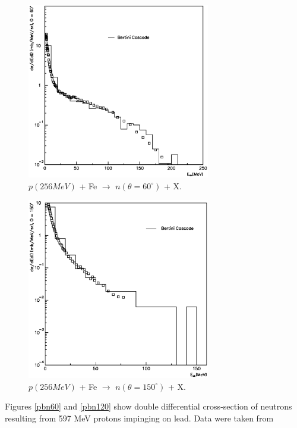 \documentclass[twocolumn,twoside,slac,floatfix]{revtex4}
\begin{document}
\begin{figure}
  \includegraphics[width=80mm,keepaspectratio]{pn_fe_256_n_a2.eps}
  \caption{$p(256 MeV)$ + Fe $\rightarrow$ $n(\theta = 60^{\circ})$ + X.}
  \label{n60}
\end{figure}


\begin{figure}
  \includegraphics[width=80mm,keepaspectratio]{pn_fe_256_n_a4.eps}
  \caption{$p(256 MeV)$ + Fe $\rightarrow$ $n(\theta = 150^{\circ})$ + X.}
  \label{n150}
\end{figure}




Figures \ref{pbn60} and \ref{pbn120} show double differential cross-section of neutrons resulting from 597 MeV protons impinging on lead. Data were taken from \cite{597lead}
\end{document}
